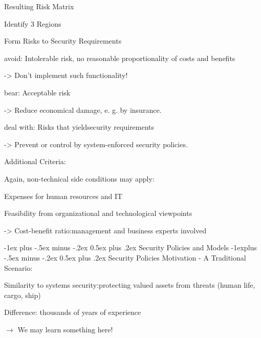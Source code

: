 \documentclass[a4paper]{article}
\makeatletter
\renewcommand{\section}{\@startsection{section}{1}{0mm}%
                                {-1ex plus -.5ex minus -.2ex}%
                                {0.5ex plus .2ex}%
                                {\normalfont\large\bfseries}}
\renewcommand{\subsection}{\@startsection{subsection}{2}{0mm}%
                                {-1explus -.5ex minus -.2ex}%
                                {0.5ex plus .2ex}%
                                {\normalfont\normalsize\bfseries}}
\makeatother
\begin{document}
\begin{multicols}{3}
    Resulting Risk Matrix

    Identify 3 Regions

    Form Risks to Security Requirements
    \begin{itemize*}
        \item avoid: Intolerable risk, no reasonable proportionality of costs and benefits
              \begin{itemize*}
                  \item -> Don’t implement such functionality!
              \end{itemize*}
        \item bear: Acceptable risk
              \begin{itemize*}
                  \item -> Reduce economical damage, e. g. by insurance.
              \end{itemize*}
        \item deal with: Risks that yieldsecurity requirements
              \begin{itemize*}
                  \item -> Prevent or control by system-enforced security policies.
              \end{itemize*}
    \end{itemize*}

    Additional Criteria:
    \begin{itemize*}
        \item Again, non-technical side conditions may apply:
              \begin{itemize*}
                  \item Expenses for human resources and IT
                  \item Feasibility from organizational and technological viewpoints
              \end{itemize*}
        \item ->  Cost-benefit ratio:management and business experts involved
    \end{itemize*}


    \section{Security Policies and Models}
    \subsection{Security Policies}
    Motivation - A Traditional Scenario:
    \begin{itemize*}
        \item Similarity to systems security:protecting valued assets from threats (human life, cargo, ship)
        \item Difference: thousands of years of experience
        \item $\rightarrow$  We may learn something here!
    \end{itemize*}


\end{multicols}
\end{document}
